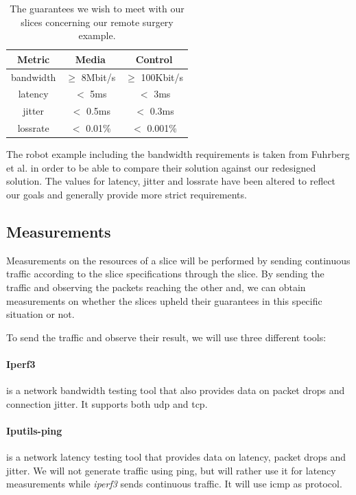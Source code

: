 \begin{table}[ht]
    \centering
    \begin{tabular}{ |c|c|c| }
        \hline
        \textbf{Metric} & \textbf{Media} & \textbf{Control} \\
        \hline
        \Gls{bandwidth} & $\geq$ 8Mbit/s & $\geq$ 100Kbit/s \\
        \Gls{latency}   & $<$ 5ms        & $<$ 3ms          \\
        \Gls{jitter}    & $<$ 0.5ms      & $<$ 0.3ms        \\
        \Gls{lossrate}  & $<$ 0.01\%     & $<$ 0.001\%      \\
        \hline
    \end{tabular}
    \caption[Slice \acrshort{qos} guarantees in our remote surgery example]{The guarantees we wish to meet with our slices concerning our remote surgery example.}
    \label{table:slices}
\end{table}

The robot example including the \gls{bandwidth} requirements is taken from Fuhrberg et al. \cite{SE4} in order to be able to compare their solution against our redesigned solution. The values for \gls{latency}, \gls{jitter} and \gls{lossrate} have been altered to reflect our goals and generally provide more strict requirements.

\subsection{Measurements}
\label{measurements}
Measurements on the resources of a slice will be performed by sending continuous traffic according to the slice specifications through the slice. By sending the traffic and observing the packets reaching the other and, we can obtain measurements on whether the slices upheld their guarantees in this specific situation or not.

To send the traffic and observe their result, we will use three different tools:

\paragraph{Iperf3} \cite{iperf3} is a network \gls{bandwidth} testing tool that also provides data on packet drops and connection \gls{jitter}. It supports both \acrshort{udp} and \acrshort{tcp}.

\paragraph{Iputils-ping} \cite{iputils} is a network \gls{latency} testing tool that provides data on \gls{latency}, packet drops and \gls{jitter}. We will not generate traffic using ping, but will rather use it for \gls{latency} measurements while \textit{iperf3} sends continuous traffic. It will use \acrshort{icmp} as protocol.

